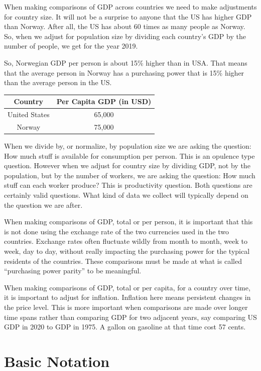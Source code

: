 \documentclass[
]{book}
\begin{document}
When making comparisons of GDP across countries we need to make adjustments for country size. It will not be a surprise to anyone that the US has higher GDP than Norway. After all, the US has about 60 times as many people as Norway. So, when we adjust for population size by dividing each country's GDP by the number of people, we get for the year 2019.

So, Norwegian GDP per person is about 15\% higher than in USA. That means that the average person in Norway has a purchasing power that is 15\% higher than the average person in the US.

\begin{longtable}[]{@{}cc@{}}
\toprule
Country & Per Capita GDP (in USD) \\
\midrule
\endhead
United States & 65,000 \\
Norway & 75,000 \\
\bottomrule
\end{longtable}

When we divide by, or normalize, by population size we are asking the question: How much stuff is available for consumption per person. This is an opulence type question. However when we adjust for country size by dividing GDP, not by the population, but by the number of workers, we are asking the question: How much stuff can each worker produce? This is productivity question. Both questions are certainly valid questions. What kind of data we collect will typically depend on the question we are after.

When making comparisons of GDP, total or per person, it is important that this is not done using the exchange rate of the two currencies used in the two countries. Exchange rates often fluctuate wildly from month to month, week to week, day to day, without really impacting the purchasing power for the typical residents of the countries. These comparisons must be made at what is called ``purchasing power parity'' to be meaningful.

When making comparisons of GDP, total or per capita, for a country over time, it is important to adjust for inflation. Inflation here means persistent changes in the price level. This is more important when comparisons are made over longer time spans rather than comparing GDP for two adjacent years, say comparing US GDP in 2020 to GDP in 1975. A gallon on gasoline at that time cost 57 cents.

\hypertarget{basic-notation}{%
\section{Basic Notation}\label{basic-notation}}
\end{document}
